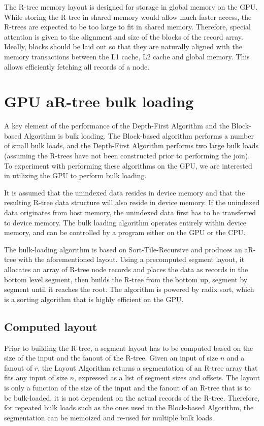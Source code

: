 The R-tree memory layout is designed for storage in global memory on the GPU. While storing the R-tree in shared memory would allow much faster access, the R-trees are expected to be too large to fit in shared memory. Therefore, special attention is given to the alignment and size of the blocks of the record array. Ideally, blocks should be laid out so that they are naturally aligned with the memory transactions between the L1 cache, L2 cache and global memory. This allows efficiently fetching all records of a node.

\section{GPU aR-tree bulk loading}

A key element of the performance of the Depth-First Algorithm and the Block-based Algorithm is bulk loading. The Block-based algorithm performs a number of small bulk loads, and the Depth-First Algorithm performs two large bulk loads (assuming the R-trees have not been constructed prior to performing the join). To experiment with performing these algorithms on the GPU, we are interested in utilizing the GPU to perform bulk loading.

It is assumed that the unindexed data resides in device memory and that the resulting R-tree data structure will also reside in device memory. If the unindexed data originates from host memory, the unindexed data first has to be transferred to device memory. The bulk loading algorithm operates entirely within device memory, and can be controlled by a program either on the GPU or the CPU.

The bulk-loading algorithm is based on Sort-Tile-Recursive and produces an aR-tree with the aforementioned layout. Using a precomputed segment layout, it allocates an array of R-tree node records and places the data as records in the bottom level segment, then builds the R-tree from the bottom up, segment by segment until it reaches the root. The algorithm is powered by radix sort, which is a sorting algorithm that is highly efficient on the GPU.

\subsection{Computed layout}

Prior to building the R-tree, a segment layout has to be computed based on the size of the input and the fanout of the R-tree. Given an input of size \(n\) and a fanout of \(r\), the Layout Algorithm returns a segmentation of an R-tree array that fits any input of size \(n\), expressed as a list of segment sizes and offsets. The layout is only a function of the size of the input and the fanout of an R-tree that is to be bulk-loaded, it is not dependent on the actual records of the R-tree. Therefore, for repeated bulk loads such as the ones used in the Block-based Algorithm, the segmentation can be memoized and re-used for multiple bulk loads.

